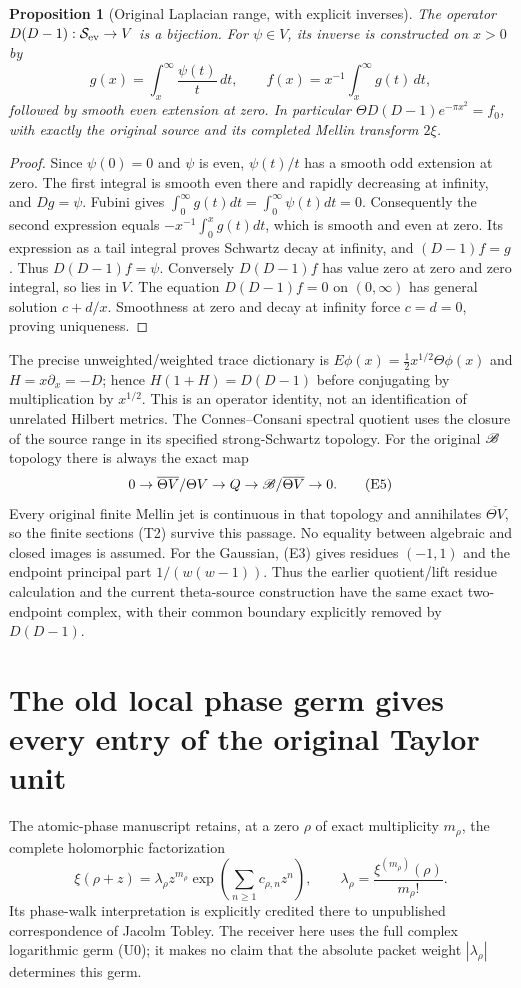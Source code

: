 \documentclass[11pt]{article}
\newtheorem{proposition}[theorem]{Proposition}
\begin{document}
\begin{proposition}[Original Laplacian range, with explicit inverses]
The operator $D(D-1):\mathcal S_{\rm ev}\to V$ is a bijection.
For $\psi\in V$, its inverse is constructed on $x>0$ by
\[
 g(x)=\int_x^\infty\frac{\psi(t)}t\,dt,
 \qquad f(x)=x^{-1}\int_x^\infty g(t)\,dt,
 \tag{E4}
\]
followed by smooth even extension at zero. In particular
$\Theta D(D-1)e^{-\pi x^2}=f_0$, with exactly the original source
and its completed Mellin transform $2\xi$.
\end{proposition}
\begin{proof}
Since $\psi(0)=0$ and $\psi$ is even, $\psi(t)/t$ has a smooth odd
extension at zero. The first integral is smooth even there and rapidly
decreasing at infinity, and $Dg=\psi$. Fubini gives
$\int_0^\infty g(t)dt=\int_0^\infty\psi(t)dt=0$.
Consequently the second expression equals
$-x^{-1}\int_0^xg(t)dt$, which is smooth and even at zero.
Its expression as a tail integral proves Schwartz decay at infinity,
and $(D-1)f=g$. Thus $D(D-1)f=\psi$.
Conversely $D(D-1)f$ has value zero at zero and zero integral, so lies
in $V$. The equation $D(D-1)f=0$ on $(0,\infty)$ has general solution
$c+d/x$. Smoothness at zero and decay at infinity force $c=d=0$,
proving uniqueness.
\end{proof}

The precise unweighted/weighted trace dictionary is
$E\phi(x)=\tfrac12 x^{1/2}\Theta\phi(x)$ and
$H=x\partial_x=-D$; hence $H(1+H)=D(D-1)$ before conjugating
by multiplication by $x^{1/2}$. This is an operator identity, not an
identification of unrelated Hilbert metrics. The Connes--Consani spectral
quotient uses the closure of the source range in its specified
strong-Schwartz topology. For the original $\mathscr B$ topology there is always
the exact map
\[
 0\to\overline{\Theta V}/\Theta V\to Q
       \to\mathscr B/\overline{\Theta V}\to0.\tag{E5}
\]
Every original finite Mellin jet is continuous in that topology and
annihilates $\overline{\Theta V}$, so the finite sections (T2) survive
this passage. No equality between algebraic and closed images is assumed.
For the Gaussian, (E3) gives residues $(-1,1)$ and the endpoint principal
part $1/(w(w-1))$. Thus the earlier quotient/lift residue calculation
and the current theta-source construction have the same exact two-endpoint
complex, with their common boundary explicitly removed by $D(D-1)$.

\section{The old local phase germ gives every entry of the original Taylor unit}
The atomic-phase manuscript retains, at a zero $\rho$ of exact multiplicity
$m_\rho$, the complete holomorphic factorization
\[
 \xi(\rho+z)=\lambda_\rho z^{m_\rho}
       \exp\!\left(\sum_{n\geq1}c_{\rho,n}z^n\right),\qquad
 \lambda_\rho=\frac{\xi^{(m_\rho)}(\rho)}{m_\rho!}.
 \tag{U0}
\]
Its phase-walk interpretation is explicitly credited there to unpublished
correspondence of Jacolm Tobley. The receiver here uses the full complex
logarithmic germ (U0); it makes no claim that the absolute packet weight
$|\lambda_\rho|$ determines this germ.
\end{document}
